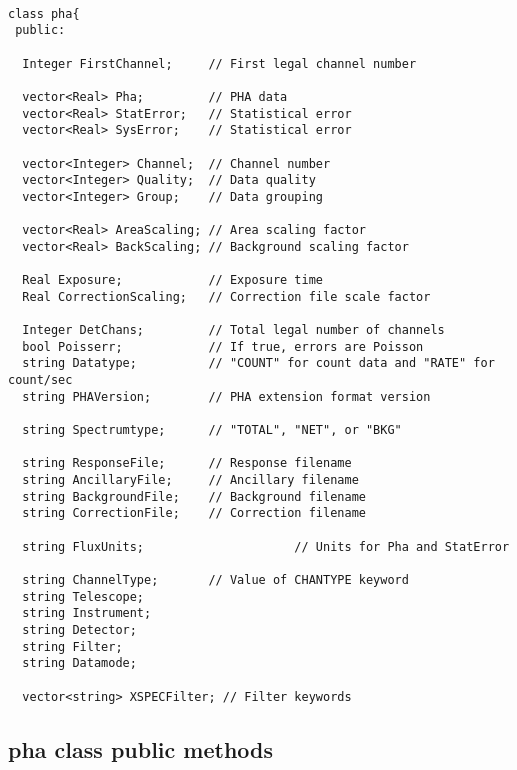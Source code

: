 \documentclass[11pt]{book}
\begin{document}
\begin{verbatim}

class pha{
 public:

  Integer FirstChannel;     // First legal channel number

  vector<Real> Pha;         // PHA data
  vector<Real> StatError;   // Statistical error 
  vector<Real> SysError;    // Statistical error 

  vector<Integer> Channel;  // Channel number
  vector<Integer> Quality;  // Data quality 
  vector<Integer> Group;    // Data grouping 

  vector<Real> AreaScaling; // Area scaling factor 
  vector<Real> BackScaling; // Background scaling factor 

  Real Exposure;            // Exposure time 
  Real CorrectionScaling;   // Correction file scale factor 

  Integer DetChans;         // Total legal number of channels
  bool Poisserr;            // If true, errors are Poisson 
  string Datatype;          // "COUNT" for count data and "RATE" for count/sec 
  string PHAVersion;        // PHA extension format version 

  string Spectrumtype;      // "TOTAL", "NET", or "BKG" 

  string ResponseFile;      // Response filename 
  string AncillaryFile;     // Ancillary filename 
  string BackgroundFile;    // Background filename 
  string CorrectionFile;    // Correction filename 

  string FluxUnits;                     // Units for Pha and StatError

  string ChannelType;       // Value of CHANTYPE keyword 
  string Telescope;                                          
  string Instrument;
  string Detector;
  string Filter;
  string Datamode;

  vector<string> XSPECFilter; // Filter keywords 
\end{verbatim}

\subsection{pha class public methods}
\end{document}
